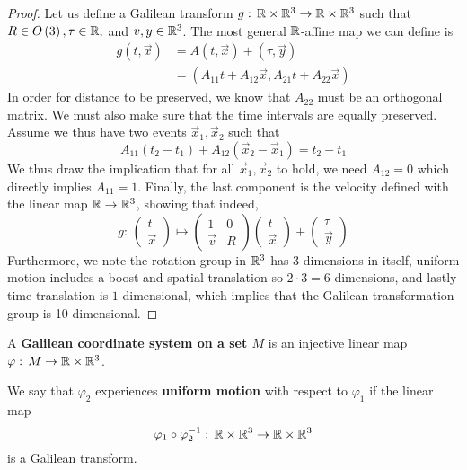 \documentclass{article}
\begin{document}
		\begin{proof}
			Let us define a Galilean transform $g: \, \mathbb{R} \times \mathbb{R}^3 \to \mathbb{R} \times \mathbb{R}^3 $ such that $R \in O\left(3\right), \tau \in \mathbb{R},$ and $v, y \in \mathbb{R}^3$.
			The most general $\mathbb{R}$-affine map we can define is
			\begin{align*}
				g \left(t, \vec{x} \right) &=  A\left(t, \vec{x} \right) + \left( \tau, \vec{y}\right)\\
				&= \left( A_{11} t + A_{12} \vec{x}, A_{21} t + A_{22} \vec{x} \right) 
			\end{align*}
			In order for distance to be preserved, we know that $A_{22}$ must be an orthogonal matrix. We must also make sure that the time intervals are equally preserved. Assume we thus have two events $\vec{x}_1, \vec{x}_2$ such that
			$$ A_{11} \left( t_2 - t_1\right) + A_{12} \left(\vec{x}_2 - \vec{x}_1 \right) = t_2 - t_1$$
			We thus draw the implication that for all $\vec{x}_1, \vec{x}_2$ to hold, we need $A_{12} = 0$ which directly implies $A_{11} = 1$. Finally, the last component is the velocity defined with the linear map $\mathbb{R} \to \mathbb{R}^3$, showing that indeed, 
			$$ g : \, 
			\begin{pmatrix}
				t \\ \vec{x}
			\end{pmatrix} \mapsto 
			\begin{pmatrix}
				1 & 0 \\
				\vec{v} & R
			\end{pmatrix} 
			\begin{pmatrix}
				t \\ \vec{x}
			\end{pmatrix} +
			\begin{pmatrix}
				\tau \\ \vec{y}
			\end{pmatrix}
			$$
			Furthermore, we note the rotation group in $\mathbb{R}^3$ has 3 dimensions in itself, uniform motion includes a boost and spatial translation so $2\cdot 3 = 6$ dimensions, and lastly time translation is $1$ dimensional, which implies that the Galilean transformation group is 10-dimensional.
			
		\end{proof}
		\begin{defn}
			A \textbf{Galilean coordinate system on a set $M$} is an injective linear map $\varphi: \, M \to \mathbb{R} \times \mathbb{R}^3$. 
		\end{defn}
		\begin{defn}
			We say that $\varphi_2$ experiences \textbf{uniform motion} with respect to $\varphi_1$ if the linear map $$\varphi_1 \circ \varphi_2^{-1}: \, \mathbb{R}\times \mathbb{R}^3\to \mathbb{R} \times \mathbb{R}^3$$ is a Galilean transform.  
		\end{defn} 
\end{document}
